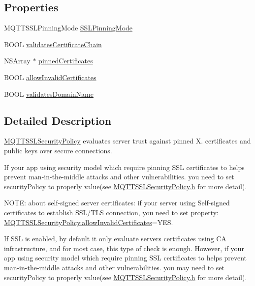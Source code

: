 \subsection*{Properties}
\begin{DoxyCompactItemize}
\item 
M\+Q\+T\+T\+S\+S\+L\+Pinning\+Mode \hyperlink{interface_m_q_t_t_s_s_l_security_policy_aca548d3c82c982c275e6c68d92648d89}{S\+S\+L\+Pinning\+Mode}
\item 
B\+O\+OL \hyperlink{interface_m_q_t_t_s_s_l_security_policy_ad54371d7cfb587c908173d032df33dbb}{validates\+Certificate\+Chain}
\item 
N\+S\+Array $\ast$ \hyperlink{interface_m_q_t_t_s_s_l_security_policy_a83bc83437d250926466effce0a949371}{pinned\+Certificates}
\item 
B\+O\+OL \hyperlink{interface_m_q_t_t_s_s_l_security_policy_a42fe688d550833a1f903be92b72cf384}{allow\+Invalid\+Certificates}
\item 
B\+O\+OL \hyperlink{interface_m_q_t_t_s_s_l_security_policy_a905b5b1a0d5498ed11d36b9ca60514fc}{validates\+Domain\+Name}
\end{DoxyCompactItemize}


\subsection{Detailed Description}
{\ttfamily \hyperlink{interface_m_q_t_t_s_s_l_security_policy}{M\+Q\+T\+T\+S\+S\+L\+Security\+Policy}} evaluates server trust against pinned X. certificates and public keys over secure connections.

If your app using security model which require pinning S\+SL certificates to helps prevent man-\/in-\/the-\/middle attacks and other vulnerabilities. you need to set security\+Policy to properly value(see \hyperlink{_m_q_t_t_s_s_l_security_policy_8h_source}{M\+Q\+T\+T\+S\+S\+L\+Security\+Policy.\+h} for more detail).

N\+O\+TE\+: about self-\/signed server certificates\+: if your server using Self-\/signed certificates to establish S\+S\+L/\+T\+LS connection, you need to set property\+: \hyperlink{interface_m_q_t_t_s_s_l_security_policy_a42fe688d550833a1f903be92b72cf384}{M\+Q\+T\+T\+S\+S\+L\+Security\+Policy.\+allow\+Invalid\+Certificates}=Y\+ES.

If S\+SL is enabled, by default it only evaluate server\textquotesingle{}s certificates using CA infrastructure, and for most case, this type of check is enough. However, if your app using security model which require pinning S\+SL certificates to helps prevent man-\/in-\/the-\/middle attacks and other vulnerabilities. you may need to set security\+Policy to properly value(see \hyperlink{_m_q_t_t_s_s_l_security_policy_8h_source}{M\+Q\+T\+T\+S\+S\+L\+Security\+Policy.\+h} for more detail).

